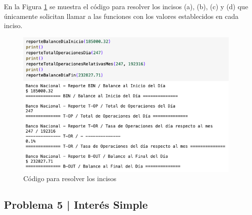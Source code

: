 \documentclass{article}
\begin{document}
\break
\noindent
En la Figura \ref{fig:s104-2} se muestra el código para resolver los incisos (a), (b), (c) y (d) que únicamente solicitan llamar a las funciones con los valores establecidos en cada inciso.
\begin{figure}[!ht]
    \centering
    \begin{minipage}{\textwidth}
        \centering
        \includegraphics[width=\textwidth]{figures/s104-2.png}
    \end{minipage}
    \captionsetup{width=0.9\textwidth}
    \caption{Código para resolver los incisos}
    \label{fig:s104-2}
\end{figure}

\clearpage

\subsection*{Problema 5 | Interés Simple}
\end{document}
